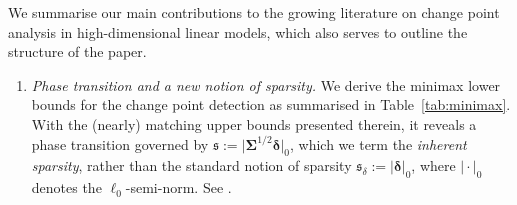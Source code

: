 \documentclass[11pt, a4paper]{article}
\theoremstyle{definition}
\theoremstyle{definition}
\theoremstyle{definition}
\theoremstyle{definition}
\theoremstyle{definition}
\theoremstyle{remark}
\theoremstyle{definition}
\theoremstyle{definition}
\theoremstyle{definition}
\begin{document}
We summarise our main contributions to the growing literature on change point analysis in high-dimensional linear models, which also serves to outline the structure of the paper.
\begin{enumerate}[label = (\roman*)]
\item \emph{Phase transition and a new notion of sparsity.} 
We derive the minimax lower bounds for the change point detection as summarised in Table~\ref{tab:minimax}. With the (nearly) matching upper bounds presented therein, it reveals a phase transition governed by $\mathfrak{s} := \vert\bm\Sigma^{1/2} \bm\delta\vert_0$, which we term the \emph{inherent sparsity}, rather than the standard notion of sparsity $\mathfrak{s}_\delta := \vert\bm\delta\vert_0$, where $\vert \cdot \vert_0$ denotes the $\ell_0$-semi-norm.  
See .


\end{enumerate}
\end{document}
